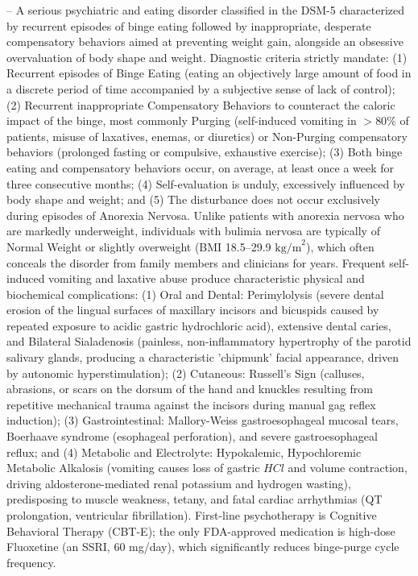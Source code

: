 -- A serious psychiatric and eating disorder classified in the DSM-5 characterized by recurrent episodes of binge eating followed by inappropriate, desperate compensatory behaviors aimed at preventing weight gain, alongside an obsessive overvaluation of body shape and weight. Diagnostic criteria strictly mandate: (1) Recurrent episodes of Binge Eating (eating an objectively large amount of food in a discrete period of time accompanied by a subjective sense of lack of control); (2) Recurrent inappropriate Compensatory Behaviors to counteract the caloric impact of the binge, most commonly Purging (self-induced vomiting in $>80\%$ of patients, misuse of laxatives, enemas, or diuretics) or Non-Purging compensatory behaviors (prolonged fasting or compulsive, exhaustive exercise); (3) Both binge eating and compensatory behaviors occur, on average, at least once a week for three consecutive months; (4) Self-evaluation is unduly, excessively influenced by body shape and weight; and (5) The disturbance does not occur exclusively during episodes of Anorexia Nervosa. Unlike patients with anorexia nervosa who are markedly underweight, individuals with bulimia nervosa are typically of Normal Weight or slightly overweight (BMI 18.5--29.9 $\text{kg/m}^2$), which often conceals the disorder from family members and clinicians for years. Frequent self-induced vomiting and laxative abuse produce characteristic physical and biochemical complications: (1) Oral and Dental: Perimylolysis (severe dental erosion of the lingual surfaces of maxillary incisors and bicuspids caused by repeated exposure to acidic gastric hydrochloric acid), extensive dental caries, and Bilateral Sialadenosis (painless, non-inflammatory hypertrophy of the parotid salivary glands, producing a characteristic 'chipmunk' facial appearance, driven by autonomic hyperstimulation); (2) Cutaneous: Russell's Sign (calluses, abrasions, or scars on the dorsum of the hand and knuckles resulting from repetitive mechanical trauma against the incisors during manual gag reflex induction); (3) Gastrointestinal: Mallory-Weiss gastroesophageal mucosal tears, Boerhaave syndrome (esophageal perforation), and severe gastroesophageal reflux; and (4) Metabolic and Electrolyte: Hypokalemic, Hypochloremic Metabolic Alkalosis (vomiting causes loss of gastric $HCl$ and volume contraction, driving aldosterone-mediated renal potassium and hydrogen wasting), predisposing to muscle weakness, tetany, and fatal cardiac arrhythmias (QT prolongation, ventricular fibrillation). First-line psychotherapy is Cognitive Behavioral Therapy (CBT-E); the only FDA-approved medication is high-dose Fluoxetine (an SSRI, 60 mg/day), which significantly reduces binge-purge cycle frequency.

